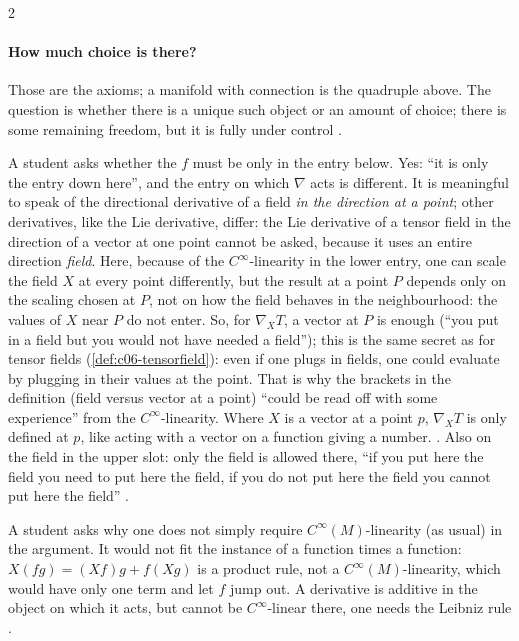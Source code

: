 \begin{paracol}{2}
\paragraph{How much choice is there?} Those are the axioms; a manifold with connection is the quadruple above. The question is whether there is a unique such object or an amount of choice; there is some remaining freedom, but it is fully under control .

\begin{coursenote}
A student asks whether the $f$ must be only in the entry below. Yes: ``it is only the entry down here'', and the entry on which $\nabla$ acts is different. It is meaningful to speak of the directional derivative of a field \emph{in the direction at a point}; other derivatives, like the Lie derivative, differ: the Lie derivative of a tensor field in the direction of a vector at one point cannot be asked, because it uses an entire direction \emph{field}.
Here, because of the $C^\infty$-linearity in the lower entry, one can scale the field $X$ at every point differently, but the result at a point $P$ depends only on the scaling chosen at $P$, not on how the field behaves in the neighbourhood: the values of $X$ near $P$ do not enter. So, for $\nabla_XT$, a vector at $P$ is enough (``you put in a field but you would not have needed a field''); this is the same secret as for tensor fields (\cref{def:c06-tensorfield}): even if one plugs in fields, one could evaluate by plugging in their values at the point. That is why the brackets in the definition (field versus vector at a point) ``could be read off with some experience'' from the $C^\infty$-linearity. Where $X$ is a vector at a point $p$, $\nabla_XT$ is only defined at $p$, like acting with a vector on a function giving a number.
.
Also on the field in the upper slot: only the field is allowed there, ``if you put here the field you need to put here the field, if you do not put here the field you cannot put here the field''
.
\end{coursenote}

\begin{aside}
A student asks why one does not simply require $C^\infty(M)$-linearity (as usual) in the argument. It would not fit the instance of a function times a function: $X(fg)=(Xf)g+f(Xg)$ is a product rule, not a $C^\infty(M)$-linearity, which would have only one term and let $f$ jump out. A derivative is additive in the object on which it acts, but cannot be $C^\infty$-linear there, one needs the Leibniz rule
.
\end{aside}


\end{paracol}
